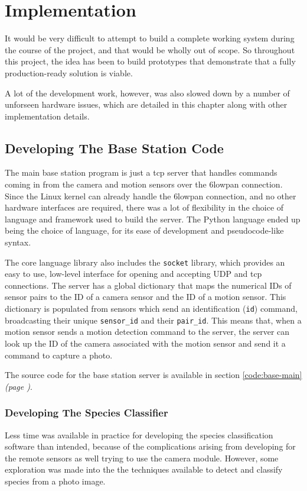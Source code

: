 \chapter{Implementation}

It would be very difficult to attempt to build a complete working system
during the course of the project, and that would be wholly out of scope. So
throughout this project, the idea has been to build prototypes that
demonstrate that a fully production-ready solution is viable.

A lot of the development work, however, was also slowed down by a number of
unforseen hardware issues, which are detailed in this chapter along with
other implementation details.

\section{Developing The Base Station Code}
The main base station program is just a \acrshort{tcp} server that handles
commands coming in from the camera and motion sensors over the \gls{6lowpan}
connection. Since the Linux kernel can already handle the \gls{6lowpan}
connection, and no other hardware interfaces are required, there was a lot of
flexibility in the choice of language and framework used to build the server.
The Python language ended up being the choice of language, for its ease of
development and pseudocode-like syntax.

The core language library also includes the \texttt{socket} library, which
provides an easy to use, low-level interface for opening and accepting UDP
and \acrshort{tcp} connections. The server has a global dictionary that maps
the numerical IDs of sensor pairs to the ID of a camera sensor and the ID of
a motion sensor. This dictionary is populated from sensors which send an
identification (\texttt{id}) command, broadcasting their unique
\texttt{sensor\_id} and their \texttt{pair\_id}. This means that, when a
motion sensor sends a motion detection command to the server, the server can
look up the ID of the camera associated with the motion sensor and send it a
command to capture a photo.

The source code for the base station server is available in section
\ref{code:base-main} \textit{(page \pageref{code:base-main})}.

\subsection{Developing The Species Classifier}
Less time was available in practice for developing the species classification
software than intended, because of the complications arising from developing
for the remote sensors as well trying to use the camera module. However, some
exploration was made into the the techniques available to detect and classify
species from a photo image.

